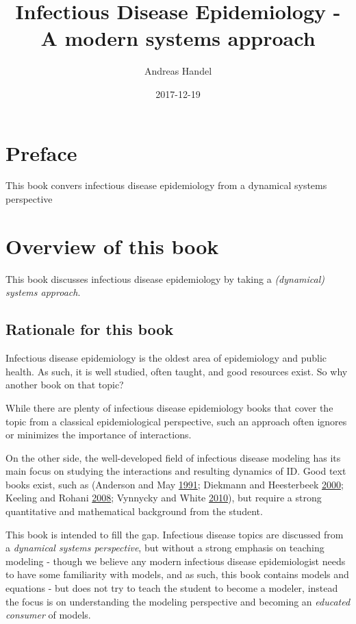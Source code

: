\documentclass[]{book}
\title{Infectious Disease Epidemiology - A modern systems approach}
\author{Andreas Handel}
\date{2017-12-19}
\theoremstyle{definition}
\theoremstyle{definition}
\theoremstyle{definition}
\theoremstyle{remark}
\begin{document}
\maketitle

{
\setcounter{tocdepth}{1}
\tableofcontents
}
\chapter*{Preface}\label{preface}

This book convers infectious disease epidemiology from a dynamical
systems perspective

\chapter{Overview of this book}\label{overview-of-this-book}

This book discusses infectious disease epidemiology by taking a
\emph{(dynamical) systems approach}.

\section{Rationale for this book}\label{rationale-for-this-book}

Infectious disease epidemiology is the oldest area of epidemiology and
public health. As such, it is well studied, often taught, and good
resources exist. So why another book on that topic?

While there are plenty of infectious disease epidemiology books that
cover the topic from a classical epidemiological perspective, such an
approach often ignores or minimizes the importance of interactions.

On the other side, the well-developed field of infectious disease
modeling has its main focus on studying the interactions and resulting
dynamics of ID. Good text books exist, such as (Anderson and May
\protect\hyperlink{ref-anderson91}{1991}; Diekmann and Heesterbeek
\protect\hyperlink{ref-diekmann00}{2000}; Keeling and Rohani
\protect\hyperlink{ref-keeling08}{2008}; Vynnycky and White
\protect\hyperlink{ref-vynnycky10}{2010}), but require a strong
quantitative and mathematical background from the student.

This book is intended to fill the gap. Infectious disease topics are
discussed from a \emph{dynamical systems perspective}, but without a
strong emphasis on teaching modeling - though we believe any modern
infectious disease epidemiologist needs to have some familiarity with
models, and as such, this book contains models and equations - but does
not try to teach the student to become a modeler, instead the focus is
on understanding the modeling perspective and becoming an \emph{educated
consumer} of models.
\end{document}
